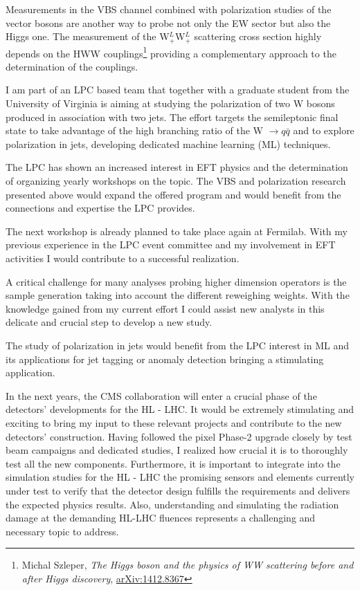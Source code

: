 {\begin{flushleft}
Measurements in the VBS channel combined with polarization studies of the vector bosons are another way to probe not only the EW sector but also the Higgs one.
The measurement of the  W$^L_+$W$^L_+$ scattering cross section highly depends on the HWW couplings\footnote{Michal Szleper, {\em The Higgs boson and the physics of WW scattering before and after Higgs discovery}, \href{https://arxiv.org/pdf/1412.8367}{arXiv:1412.8367}} providing a complementary approach to the determination of the couplings. 

I am part of an LPC based team that together with a graduate student from the University of Virginia is aiming at studying the polarization of two W bosons produced in association with two jets. The effort targets the semileptonic final state to take advantage of the high branching ratio of the W $\to q\bar{q}$ and to explore polarization in jets, developing dedicated machine learning (ML) techniques. 

\vspace{\baselineskip}
 
The LPC has shown an increased interest in EFT physics and the determination of organizing yearly workshops on the topic. The VBS and polarization research presented above would expand the offered program and would benefit from the connections and expertise the LPC provides.

The next workshop is already planned to take place again at Fermilab. With my previous experience in the LPC event committee and my involvement in EFT activities I would contribute to a successful realization. 

A critical challenge for many analyses probing higher dimension operators is the sample generation taking into account the different reweighing weights. With the knowledge gained from my current effort I could assist new analysts in this delicate and crucial step to develop a new study.

The study of polarization in jets would benefit from the LPC interest in ML and its applications for jet tagging or anomaly detection bringing a stimulating application.

\vspace{\baselineskip}

\vspace{\baselineskip}
In the next years, the CMS collaboration will enter a crucial phase of the detectors' developments for the HL - LHC.  It would be extremely stimulating and exciting to bring my input to these relevant projects and contribute to the new detectors' construction. Having followed the pixel Phase-2 upgrade closely by test beam campaigns and dedicated studies, I realized how crucial it is to thoroughly test all the new components. Furthermore, it is important to integrate into the simulation studies for the HL - LHC the promising sensors and elements currently under test to verify that the detector design fulfills the requirements and delivers the expected physics results. Also, understanding and simulating the radiation damage at the demanding HL-LHC fluences represents a challenging and necessary topic to address. 


\end{flushleft}}
